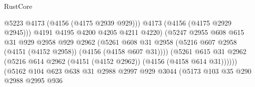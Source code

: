 \begin{lexlean}{RustCore}
\begin{coremodule}
                                            @5223
                                            @4173
                                            (@4156 (@4175 @2939 @929)))
                                          @4173
                                          (@4156 (@4175 @2929 @2945)))
                                        @4191
                                        @4195
                                        @4200
                                        @4205
                                        @4211
                                        @4220)
                                      (@5247
                                        @2955
                                        @608
                                        @615
                                        @31
                                        @929
                                        @2958
                                        @929
                                        @2962
                                        (@5261
                                          @608
                                          @31
                                          @2958
                                          (@5216
                                            @607
                                            @2958
                                            (@4151 (@4152 @2958))
                                            (@4156 (@4158 @607 @31))))
                                        (@5261
                                          @615
                                          @31
                                          @2962
                                          (@5216
                                            @614
                                            @2962
                                            (@4151 (@4152 @2962))
                                            (@4156 (@4158 @614 @31))))))
                                    (@5162
                                      @104
                                      @623
                                      @638
                                      @31
                                      @2988
                                      @2997
                                      @929
                                      @3044
                                      (@5173
                                        @103
                                        @35
                                        @290
                                        @2988
                                        @2995
                                        @936

\end{coremodule}
\end{lexlean}
